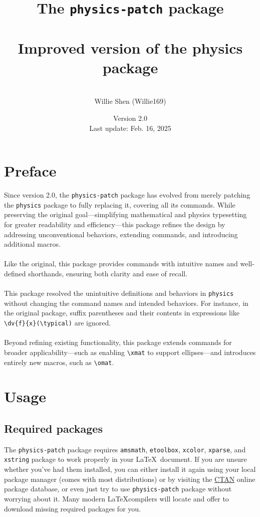 \documentclass[a4paper,12pt]{article}
\title{The \texttt{physics-patch} package\\\mbox{}\\\textnormal{\large Improved version of the physics package}}
\author{\mbox{}\\Willie Shen (Willie169)}
\date{Version 2.0\\\textnormal{Last update: Feb. 16, 2025}}
\renewcommand{\maketitle}{
\begin{titlepage}
\begin{center}
\vspace*{\fill}
{\huge \bfseries \thetitle\par}
\vskip 1.5em
{\Large \theauthor\par}
\vskip 1em
{\large \thedate\par}
\vspace*{\fill}
\end{center}
\end{titlepage}
}
\begin{document}
\onehalfspacing\thispagestyle{empty}\Needspace{1\textheight}\maketitle\setcounter{page}{1}\Needspace{1\textheight}\tableofcontents\Needspace{1\textheight}\setcounter{page}{1}
\section{Preface}
Since version 2.0, the \texttt{physics-patch} package has evolved from merely patching the \texttt{physics} package to fully replacing it, covering all its commands. While preserving the original goal—simplifying mathematical and physics typesetting for greater readability and efficiency—this package refines the design by addressing unconventional behaviors, extending commands, and introducing additional macros.\\\\
Like the original, this package provides commands with intuitive names and well-defined shorthands, ensuring both clarity and ease of recall.\\\\
This package resolved the unintuitive definitions and behaviors in \texttt{physics} without changing the command names and intended behaviors. For instance, in the original package, suffix parentheses and their contents in expressions like \verb|\dv{f}{x}(\typical)| are ignored.\\\\
Beyond refining existing functionality, this package extends commands for broader applicability—such as enabling \verb|\xmat| to support ellipses—and introduces entirely new macros, such as \verb|\omat|.
\section{Usage}
\subsection{Required packages}
The \texttt{physics-patch} package requires \texttt{amsmath}, \texttt{etoolbox}, \texttt{xcolor}, \texttt{xparse}, and \texttt{xstring} package to work properly in your \LaTeX~document. If you are unsure whether you've had them installed, you can either install it again using your local package manager (comes with most distributions) or by visiting the \href{http://www.ctan.org}{CTAN} online package database, or even just try to use \texttt{physics-patch} package without worrying about it. Many modern \LaTeX compilers will locate and offer to download missing required packages for you.
\end{document}
